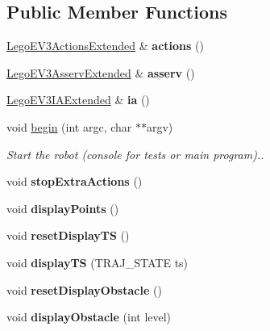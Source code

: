 \subsection*{Public Member Functions}
\begin{DoxyCompactItemize}
\item 
\mbox{\label{classLegoEV3RobotExtended_a70626aafe38f29acbaf2d3ed08018e6c}} 
\hyperlink{classLegoEV3ActionsExtended}{Lego\+E\+V3\+Actions\+Extended} \& {\bfseries actions} ()
\item 
\mbox{\label{classLegoEV3RobotExtended_aa445a8d5e5ca3fd5b1e1f00efefc9c77}} 
\hyperlink{classLegoEV3AsservExtended}{Lego\+E\+V3\+Asserv\+Extended} \& {\bfseries asserv} ()
\item 
\mbox{\label{classLegoEV3RobotExtended_ac3ff45fd243f4cac97ef7f5527c7292f}} 
\hyperlink{classLegoEV3IAExtended}{Lego\+E\+V3\+I\+A\+Extended} \& {\bfseries ia} ()
\item 
\mbox{\label{classLegoEV3RobotExtended_acf15b4325436afc76a9ba1f8b365d0ca}} 
void \hyperlink{classLegoEV3RobotExtended_acf15b4325436afc76a9ba1f8b365d0ca}{begin} (int argc, char $\ast$$\ast$argv)
\begin{DoxyCompactList}\small\item\em Start the robot (console for tests or main program).. \end{DoxyCompactList}\item 
\mbox{\label{classLegoEV3RobotExtended_a27855d5583deb6c1d35b043d9f8b16e3}} 
void {\bfseries stop\+Extra\+Actions} ()
\item 
\mbox{\label{classLegoEV3RobotExtended_aed9f7bb596a950666e603f362c4c845d}} 
void {\bfseries display\+Points} ()
\item 
\mbox{\label{classLegoEV3RobotExtended_a775c4b0ba98ca8643132ccf7b652b30e}} 
void {\bfseries reset\+Display\+TS} ()
\item 
\mbox{\label{classLegoEV3RobotExtended_ae9058c7e6760fd6051a44e2066e4fdf4}} 
void {\bfseries display\+TS} (T\+R\+A\+J\+\_\+\+S\+T\+A\+TE ts)
\item 
\mbox{\label{classLegoEV3RobotExtended_a005d29b1c0d8e50ac94972c48e5268f3}} 
void {\bfseries reset\+Display\+Obstacle} ()
\item 
\mbox{\label{classLegoEV3RobotExtended_addd4756be37b6a80e78bb90728d023ec}} 
void {\bfseries display\+Obstacle} (int level)
\end{DoxyCompactItemize}
